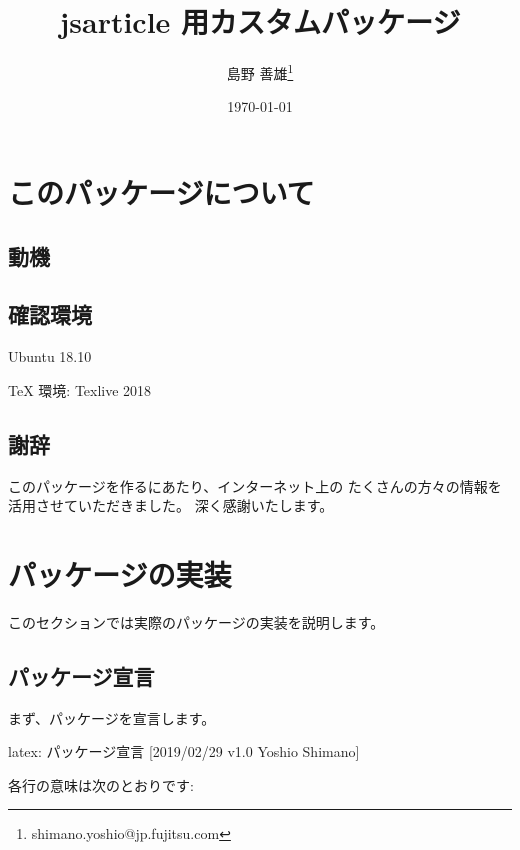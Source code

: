 \documentclass[dvipdfmx,a4j,14pt,uplatex]{jsarticle}
\author{島野 善雄\thanks{shimano.yoshio@jp.fujitsu.com}}
\date{\today}
\title{jsarticle 用カスタムパッケージ}
\begin{document}
\maketitle
\setcounter{tocdepth}{4}
\tableofcontents

\color{Black!95!White}
\section{このパッケージについて}
\label{sec:org444e444}

\subsection{動機}
\label{sec:orgc644d84}

\subsection{確認環境}
\label{sec:org3256ea5}
\begin{description}
\item[{OS}] Ubuntu 18.10
\item \TeX{} 環境: Texlive 2018
\end{description}

\subsection{謝辞}
\label{sec:org7582374}
このパッケージを作るにあたり、インターネット上の
たくさんの方々の情報を活用させていただきました。
深く感謝いたします。

\section{パッケージの実装}
\label{sec:orgbed9955}
このセクションでは実際のパッケージの実装を説明します。

\subsection{パッケージ宣言}
\label{sec:org1a71b2a}
まず、パッケージを宣言します。

\begin{programlist}[label={org293cccc}]{latex}{: パッケージ宣言}
   [2019/02/29 v1.0 Yoshio Shimano]
\def\FileVerjou#1{\gdef\@FileVerjou{#1}}
\end{programlist}

各行の意味は次のとおりです:
\end{document}

